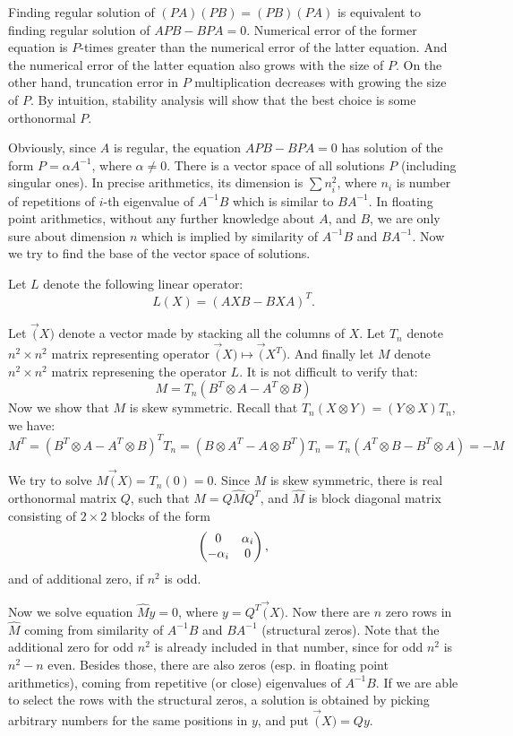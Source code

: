 \documentclass[11pt,a4paper]{article}
\begin{document}
Finding regular solution of $(PA)(PB)=(PB)(PA)$ is equivalent to
finding regular solution of $APB-BPA=0$. Numerical error of the former
equation is $P$-times greater than the numerical error of the latter
equation. And the numerical error of the latter equation also grows
with the size of $P$. On the other hand, truncation error in $P$
multiplication decreases with growing the size of $P$. By intuition,
stability analysis will show that the best choice is some orthonormal
$P$.

Obviously, since $A$ is regular, the equation $APB-BPA=0$ has solution
of the form $P=\alpha A^{-1}$, where $\alpha\neq 0$. There is a vector
space of all solutions $P$ (including singular ones). In precise
arithmetics, its dimension is $\sum n^2_i$, where $n_i$ is number of
repetitions of $i$-th eigenvalue of $A^{-1}B$ which is similar to
$BA^{-1}$. In floating point arithmetics, without any further
knowledge about $A$, and $B$, we are only sure about dimension $n$
which is implied by similarity of $A^{-1}B$ and $BA^{-1}$. Now we try
to find the base of the vector space of solutions.

Let $L$ denote the following linear operator:
$$L(X)=(AXB-BXA)^T.$$

Let $\vec(X)$ denote a vector made by stacking all the
columns of $X$. Let $T_n$ denote $n^2\times n^2$ matrix representing
operator $\vec(X)\mapsto \vec(X^T)$. And
finally let $M$ denote $n^2\times n^2$ matrix represening the operator
$L$. It is not difficult to verify that:
$$M=T_n(B^T\otimes A - A^T\otimes B)$$
Now we show that $M$ is skew symmetric. Recall that $T_n(X\otimes
Y)=(Y\otimes X)T_n$, we have:
$$M^T=(B^T\otimes A - A^T\otimes B)^TT_n=(B\otimes A^T - A\otimes B^T)T_n=
T_n(A^T\otimes B - B^T\otimes A) = -M$$

We try to solve $M\vec(X) = T_n(0) = 0$. Since $M$ is
skew symmetric, there is real orthonormal matrix $Q$, such that
$M=Q\widehat{M}Q^T$, and $\widehat{M}$ is block diagonal matrix
consisting of $2\times 2$ blocks of the form
$$\left(\begin{matrix} 0&\alpha_i\cr-\alpha_i&0\end{matrix}\right),$$
and of additional zero, if $n^2$ is odd.

Now we solve equation $\widehat{M}y=0$, where $y=Q^T\vec(X)$. Now
there are $n$ zero rows in $\widehat{M}$ coming from similarity of
$A^{-1}B$ and $BA^{-1}$ (structural zeros). Note that the additional
zero for odd $n^2$ is already included in that number, since for odd
$n^2$ is $n^2-n$ even. Besides those, there are also zeros (esp. in
floating point arithmetics), coming from repetitive (or close)
eigenvalues of $A^{-1}B$. If we are able to select the rows with the
structural zeros, a solution is obtained by picking arbitrary numbers
for the same positions in $y$, and put $\vec(X)=Qy$.
\end{document}
